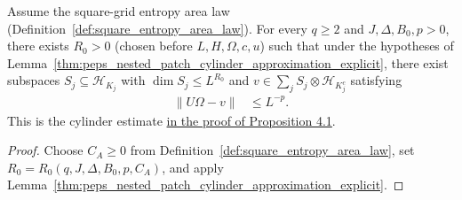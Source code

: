 \begin{lemma}
    \label{thm:peps_nested_patch_cylinder_approximation}
    \leanok
    Assume the square-grid entropy area law (Definition~\ref{def:square_entropy_area_law}). For every $q\ge2$ and $J,\Delta,B_0,p>0$, there exists $R_0>0$ (chosen before $L,H,\Omega,c,u$) such that under the hypotheses of Lemma~\ref{thm:peps_nested_patch_cylinder_approximation_explicit}, there exist subspaces $S_j\subseteq\mathcal H_{K_j}$ with $\dim S_j\le L^{R_0}$ and $v\in\sum_j S_j\otimes\mathcal H_{K_j^c}$ satisfying
    \begin{align}
        \|U\Omega-v\| & \le L^{-p}.
        \label{eq:peps_nested_patch_cylinder_approximation}
    \end{align}
    This is the cylinder estimate
    \href{https://github.com/openai/math/blob/adc7f1241b42e322a6451854ab7e4b4c146bf78a/preprints/Polynomial-PEPS-approximation-of-gapped-square-grid-ground-states-September-24-2026/build/sections/03-patches.tex\#L484-L563}{in the proof of Proposition 4.1}.
\end{lemma}
\begin{proof}
    \leanok
    Choose $C_A\ge0$ from Definition~\ref{def:square_entropy_area_law}, set $R_0=R_0(q,J,\Delta,B_0,p,C_A)$, and apply Lemma~\ref{thm:peps_nested_patch_cylinder_approximation_explicit}.
\end{proof}
